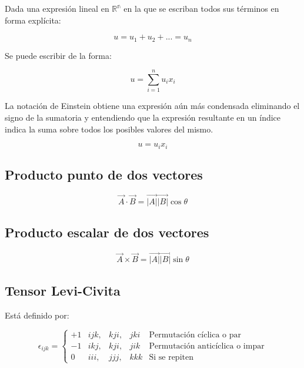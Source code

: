 \documentclass{article}
\providecommand{\abs}[1]{\lvert#1\rvert}
\begin{document}
Dada una expresión lineal en 
$\mathbb{R^n}$ en la que se escriban todos sus términos en forma explícita:

\begin{equation}
    u = u_1 + u_2 + ... = u_n
\end{equation}

Se puede escribir de la forma:

\begin{equation}
    u = \sum_{i=1}^{n} u_ix_i
\end{equation}

La notación de Einstein obtiene una expresión aún más condensada eliminando el
signo de la sumatoria y entendiendo que la expresión resultante en un índice
indica la suma sobre todos los posibles valores del mismo.

\begin{equation}
    u = u_ix_i
\end{equation}

\subsection{Producto punto de dos vectores}
\begin{equation}
    \overrightarrow{A} \cdot \overrightarrow{B}= \overrightarrow{\abs{A}} \overrightarrow{\abs{B}} \cos \theta
\end{equation}

\subsection{Producto escalar de dos vectores}

\begin{equation}
    \overrightarrow{A} \times \overrightarrow{B}= \overrightarrow{\abs{A}} \overrightarrow{\abs{B}} \sin \theta
\end{equation}

\subsection{Tensor Levi-Civita}
Está definido por:

\begin{equation}
    \epsilon_{ijk}=
    \left\lbrace\begin{array}{clllr} 
        +1 & ijk, & kji, & jki & \text{Permutación cíclica o par}\\ 
        -1 & ikj, & kji, & jik & \text{Permutación anticíclica o impar}\\
        0  & iii, & jjj, & kkk & \text{Si se repiten}
    \end{array}\right.
\end{equation}
\end{document}
